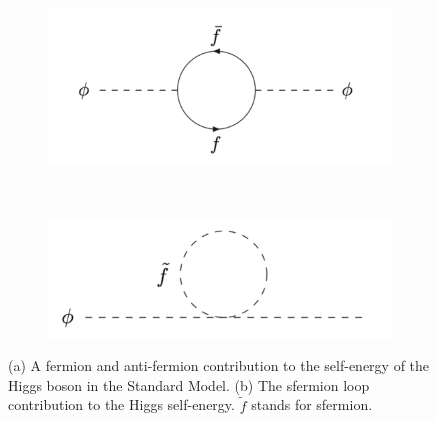 \documentclass[12pt]{report}
\begin{document}
\begin{figure}[htbp]
\begin{center}
\begin{subfigure}[b]{0.45\textwidth}
\includegraphics[scale=0.4]{figures/one-loop_diagram.pdf}
\caption{}
\label{fig: one-loop diagram}
\end{subfigure}
~%
\begin{subfigure}[b]{0.45\textwidth}
\includegraphics[scale=0.4]{figures/sfermion_one-loop_diagram.pdf}
\caption{}
\label{fig: sfermion_one-loop_diagram} 
\end{subfigure}
\caption{(a) A fermion and anti-fermion contribution to the self-energy of the Higgs boson in the Standard Model. (b) The sfermion loop contribution to the Higgs self-energy. $\widetilde{f}$ stands for sfermion.}
\label{}
\end{center}
\end{figure}
\end{document}
